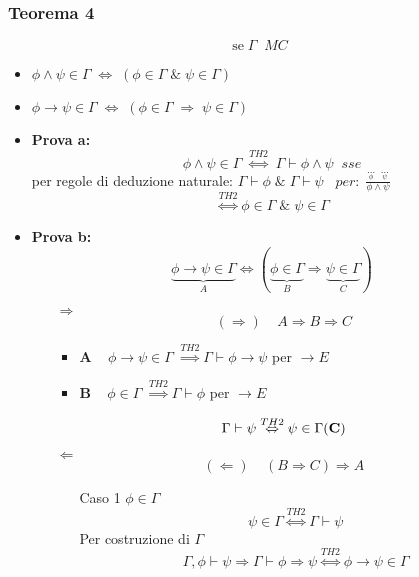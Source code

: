 \documentclass{article}
\theoremstyle{break}
\theoremstyle{break}
\theoremstyle{break}
\theoremstyle{break}
\begin{document}
\subsubsection{Teorema 4}
\[
\text{se}\;\Gamma\;\;MC
\] 
\begin{itemize}
  \item \( \phi \wedge \psi \in \Gamma\; \Leftrightarrow\; (\phi \in \Gamma\;\&\; \psi \in\Gamma)\) 
  \item \( \phi \to \psi \in \Gamma\; \Leftrightarrow\; (\phi \in  \Gamma \;\Rightarrow\; \psi \in \Gamma) \) 
\end{itemize}
\begin{itemize}
  \item 
    \textbf{Prova a:}
    \[
      \phi \wedge \psi \in \Gamma \; \stackrel{TH2}{\Leftrightarrow}\; \Gamma \vdash \phi \wedge \psi\;\;sse 
    \] 
    per regole di deduzione naturale: \( \Gamma \vdash \phi \;\&\; \Gamma \vdash \psi\;\;\; per:\; \frac{\underset{\phi}{\ldots}\;\;\underset{\psi}{\ldots}}{\phi \wedge \psi} \) 
    \[
      \stackrel{TH2}{\Leftrightarrow} \phi \in \Gamma\;\&\; \psi \in \Gamma
    \] 
  \item \textbf{Prova b:}
    \[
      \underbrace{\phi \to \psi \in \Gamma}_{A} \Leftrightarrow (\underbrace{\phi \in  \Gamma}_{B} \Rightarrow \underbrace{\psi \in \Gamma}_{C})
    \] 
    \begin{enumerate}
      \item [\( \Rightarrow\)] 
        \[
          (\Rightarrow)\;\;\;\;        A \Rightarrow B \Rightarrow C
        \] 
        \begin{itemize}
          \item \textbf{A} \( \;\;\; \phi \to  \psi \in \Gamma\; \stackrel{TH2}{\Rightarrow} \Gamma \vdash \phi \to \psi \) per \( \to E \) 
          \item \textbf{B} \( \;\;\;\phi \in \Gamma\; \stackrel{TH2}{\Rightarrow} \Gamma \vdash \phi \) per \( \to E \) 
        \end{itemize}
        \[
          \Gamma \vdash \psi \stackrel{TH2}{\Leftrightarrow} \psi \in \Gamma (\text{\textbf{C}})
        \] 
      \item [\( \Leftarrow \) ]
        \[
          (\Leftarrow)\;\;\;\; (B \Rightarrow C) \Rightarrow A
        \] 
        \begin{enumerate}
          \item [Caso 1] \( \phi \in \Gamma \) 
                    \[
          \psi \in \Gamma \stackrel{TH2}{\Leftrightarrow} \Gamma \vdash \psi
        \] 
        Per costruzione di \( \Gamma \) 
        \[
          \Gamma,\phi \vdash \psi \Rightarrow \Gamma \vdash \phi \Rightarrow \psi \stackrel{TH2}{\Leftrightarrow} \phi \to \psi \in \Gamma
        \] 


\end{enumerate}
\end{enumerate}
\end{itemize}
\end{document}
